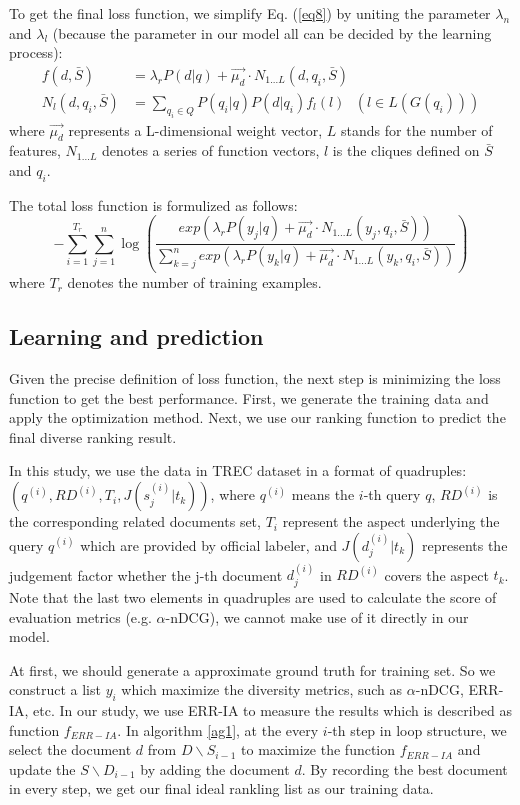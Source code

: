 \documentclass[review]{elsarticle}
\begin{document}
To get the final loss function, we simplify Eq. (\ref{eq8}) by uniting the parameter $\lambda_n$ and $\lambda_l$ (because the parameter in our model all can be decided by the learning process):
\begin{align}
	f(d, \bar{S})&=\lambda_rP(d|q)+\vec{\mu_d}\cdot N_{1...L}(d, q_i, \bar{S})\\
	N_l(d,q_i,\bar{S})&=\sum_{q_i\in Q}P(q_i|q)P(d|q_i)f_l(l)\ \ \ (l\in L(G(q_i)))
\end{align}
where $\vec{\mu_d}$ represents a L-dimensional weight vector, $L$ stands for the number of features, $N_{1...L}$ denotes a series of function vectors, $l$ is the cliques defined on $\bar{S}$ and $q_i$.

The total loss function is formulized as follows:
\begin{equation}
	-\sum_{i=1}^{T_r}\sum_{j=1}^{n}\log(\frac{exp(\lambda_rP(y_j|q)+\vec{\mu_d}\cdot N_{1...L}(y_j,q_i,\bar{S}))}{\sum_{k=j}^{n}exp(\lambda_rP(y_k|q)+\vec{\mu_d}\cdot N_{1...L}(y_k,q_i,\bar{S}))})
\end{equation}
where $T_r$ denotes the number of training examples.

\subsection{Learning and prediction}
Given the precise definition of loss function, the next step is minimizing the loss function to get the best performance. First, we generate the training data and apply the optimization method. Next, we use our ranking function to predict the final diverse ranking result.

In this study, we use the data in TREC dataset in a format of quadruples: $(q^{(i)}, RD^{(i)}, T_i, J(s_j^{(i)}|t_k))$, where $q^{(i)}$ means the $i$-th query $q$, $RD^{(i)}$ is the corresponding related documents set, $T_i$ represent the aspect underlying the query $q^{(i)}$ which are provided by official labeler, and $J(d_j^{(i)}|t_k)$ represents the judgement factor whether the j-th document $d_j^{(i)}$ in $RD^{(i)}$ covers the aspect $t_k$. Note that the last two elements in quadruples are used to calculate the score of evaluation metrics (e.g. $\alpha$-nDCG), we cannot make use of it directly in our model.

At first, we should generate a approximate ground truth for training set. So we construct a list $y_i$ which maximize the diversity metrics, such as $\alpha$-nDCG, ERR-IA, etc. In our study, we use ERR-IA to measure the results which is described as function $f_{ERR-IA}$. In algorithm \ref{ag1}, at the every $i$-th step in loop structure, we select the document $d$ from $D\backslash S_{i-1}$ to maximize the function $f_{ERR-IA}$ and update the $S\backslash D_{i-1}$ by adding the document $d$. By recording the best document in every step, we get our final ideal rankling list as our training data.
\end{document}
